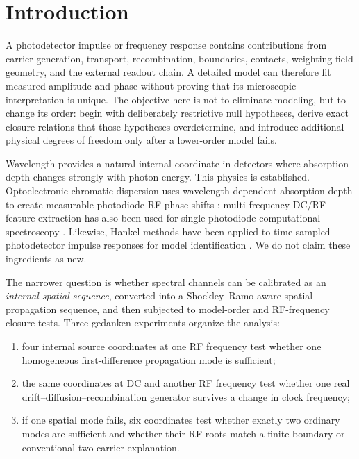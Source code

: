 \documentclass[11pt]{article}
\begin{document}
\section{Introduction}

A photodetector impulse or frequency response contains contributions from carrier generation, transport, recombination, boundaries, contacts, weighting-field geometry, and the external readout chain. A detailed model can therefore fit measured amplitude and phase without proving that its microscopic interpretation is unique. The objective here is not to eliminate modeling, but to change its order: begin with deliberately restrictive null hypotheses, derive exact closure relations that those hypotheses overdetermine, and introduce additional physical degrees of freedom only after a lower-order model fails.

Wavelength provides a natural internal coordinate in detectors where absorption depth changes strongly with photon energy. This physics is established. Optoelectronic chromatic dispersion uses wavelength-dependent absorption depth to create measurable photodiode RF phase shifts \cite{Glasser2021}; multi-frequency DC/RF feature extraction has also been used for single-photodiode computational spectroscopy \cite{Kassa2026}. Likewise, Hankel methods have been applied to time-sampled photodetector impulse responses for model identification \cite{Sun2025}. We do not claim these ingredients as new.

The narrower question is whether spectral channels can be calibrated as an \emph{internal spatial sequence}, converted into a Shockley--Ramo-aware spatial propagation sequence, and then subjected to model-order and RF-frequency closure tests. Three gedanken experiments organize the analysis:
\begin{enumerate}[label=(\roman*)]
    \item four internal source coordinates at one RF frequency test whether one homogeneous first-difference propagation mode is sufficient;
    \item the same coordinates at DC and another RF frequency test whether one real drift--diffusion--recombination generator survives a change in clock frequency;
    \item if one spatial mode fails, six coordinates test whether exactly two ordinary modes are sufficient and whether their RF roots match a finite boundary or conventional two-carrier explanation.
\end{enumerate}
\end{document}
